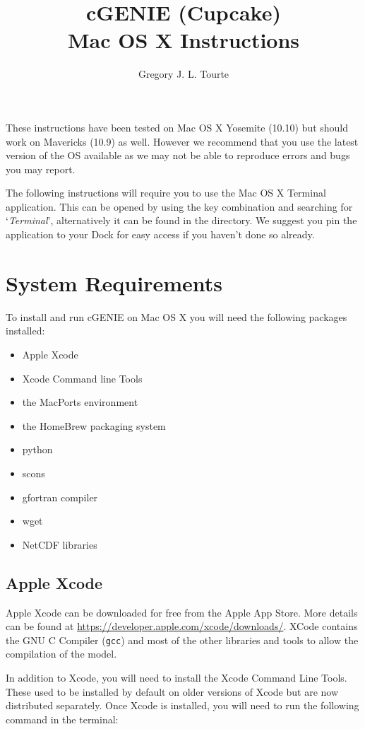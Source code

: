 \documentclass{scrartcl}
\title{cGENIE (Cupcake)\\
Mac OS X Instructions}
\author{Gregory J. L. Tourte}
\begin{document}
\maketitle

These instructions have been tested on Mac OS X Yosemite (10.10) but should
work on Mavericks (10.9) as well. However we recommend that you use the latest
version of the OS available as we may not be able to reproduce errors and bugs
you may report.

The following instructions will require you to use the Mac OS X Terminal
application. This can be opened by using the \keys{\cmd+\SPACE} key combination
and searching for `\textit{Terminal}', alternatively it can be found in the
 directory. We suggest you pin
the application to your Dock for easy access if you haven't done so already.

\section{System Requirements}

To install and run cGENIE on Mac OS X you will need the following packages
installed:

\begin{itemize}
	\item Apple Xcode
	\item Xcode Command line Tools
	\item the MacPorts environment
	\item the HomeBrew packaging system 
	\item python
	\item scons
	\item gfortran compiler 
	\item wget
	\item NetCDF libraries
\end{itemize}

\subsection{Apple Xcode}

Apple Xcode can be downloaded for free from the Apple App Store. More details
can be found at \url{https://developer.apple.com/xcode/downloads/}. XCode
contains the GNU C Compiler (\texttt{gcc}) and most of the other libraries and
tools to allow the compilation of the model.

In addition to Xcode, you will need to install the Xcode Command Line Tools.
These used to be installed by default on older versions of Xcode but are now
distributed separately. Once Xcode is installed, you will need to run the
following command in the terminal:
\end{document}
